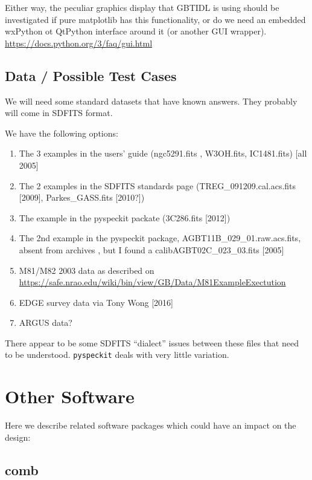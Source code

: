 \documentclass[12pt,a4paper]{article}
\begin{document}
Either way, the peculiar graphics display that GBTIDL is using should
be investigated if pure matplotlib has this functionality, or do we
need an embedded wxPython ot QtPython interface around it (or another
GUI wrapper).  \url{https://docs.python.org/3/faq/gui.html}


\subsection{Data / Possible Test Cases}

We will need some standard datasets that have known answers. They probably will come in SDFITS format.

We have the following options:

\begin{enumerate}

\item
  The 3 examples in the users' guide (ngc5291.fits , W3OH.fits, IC1481.fits) [all 2005]
\item
  The 2 examples in the SDFITS standards page (TREG\_091209.cal.acs.fits [2009], Parkes\_GASS.fits [2010?])
\item
  The example in the pyspeckit packate (3C286.fits [2012])
\item  
  The 2nd example in the pyspeckit package, AGBT11B\_029\_01.raw.acs.fits, absent from archives , but I found a calibAGBT02C\_023\_03.fits [2005]
\item
  M81/M82 2003 data as described on\newline
  \url{https://safe.nrao.edu/wiki/bin/view/GB/Data/M81ExampleExectution}
\item
  EDGE survey data via Tony Wong [2016]
\item
  ARGUS data?
\end{enumerate}

There appear to be some SDFITS ``dialect'' issues between these files that need to be understood.
{\tt pyspeckit} deals with very little variation.

\section{Other Software}

Here we describe related software packages which could have an impact on the design:

\subsection{comb}
\end{document}
